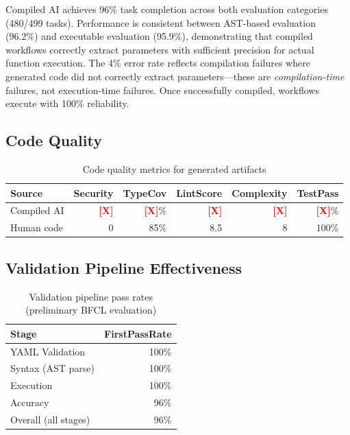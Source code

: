 \documentclass[11pt]{article}
\newcommand{\placeholder}[1]{\textcolor{red}{\textbf{[#1]}}}
\begin{document}
Compiled AI achieves 96\% task completion across both evaluation categories (480/499 tasks). Performance is consistent between AST-based evaluation (96.2\%) and executable evaluation (95.9\%), demonstrating that compiled workflows correctly extract parameters with sufficient precision for actual function execution. The 4\% error rate reflects compilation failures where generated code did not correctly extract parameters---these are \textit{compilation-time} failures, not execution-time failures. Once successfully compiled, workflows execute with 100\% reliability.

\subsection{Code Quality}

\begin{table}[ht]
\centering
\caption{Code quality metrics for generated artifacts}
\label{tab:quality-results}
\begin{tabular}{lrrrrr}
\toprule
Source & Security & TypeCov & LintScore & Complexity & TestPass \\
\midrule
Compiled AI & \placeholder{X} & \placeholder{X}\% & \placeholder{X} & \placeholder{X} & \placeholder{X}\% \\
Human code & 0 & 85\% & 8.5 & 8 & 100\% \\
\bottomrule
\end{tabular}
\end{table}

\subsection{Validation Pipeline Effectiveness}

\begin{table}[ht]
\centering
\caption{Validation pipeline pass rates (preliminary BFCL evaluation)}
\label{tab:validation-results}
\begin{tabular}{lr}
\toprule
Stage & FirstPassRate \\
\midrule
YAML Validation & 100\% \\
Syntax (AST parse) & 100\% \\
Execution & 100\% \\
Accuracy & 96\% \\
\midrule
Overall (all stages) & 96\% \\
\bottomrule
\end{tabular}
\end{table}
\end{document}
